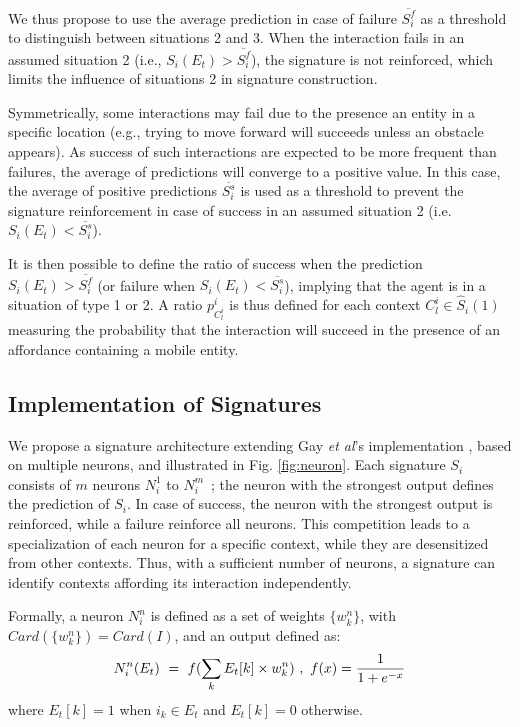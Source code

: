 \documentclass[conference]{IEEEtran}
\makeatletter
\let\cite\relax
\DeclareRobustCommand{\cite}{%
	\let\new@cite@pre\@gobble
	\@ifnextchar[\new@cite{\@citex[]}}
\def\new@cite[#1]{\@ifnextchar[{\new@citea{#1}}{\@citex[#1]}}
\def\new@citea#1{\def\new@cite@pre{#1}\@citex}
\makeatother
\begin{document}
We thus propose to use the average prediction in case of failure $\overline{S_i^f}$ as a threshold to distinguish between situations 2 and 3.
When the interaction fails in an assumed situation 2 (i.e., $S_i(E_t)>\overline{S_i^f}$), the signature is not reinforced, which limits the influence of situations 2 in signature construction. 


Symmetrically, some interactions may fail due to the presence an entity in a specific location (e.g., trying to move forward will succeeds unless an obstacle appears).
As success of such interactions are expected to be more frequent than failures, the average of predictions will converge to a positive value.
In this case, the average of positive predictions $\overline{S_i^s}$ is used as a threshold to prevent the signature reinforcement in case of success in an assumed situation 2 (i.e. $S_i(E_t)<\overline{S_i^s}$).


It is then possible to define the ratio of success when the prediction $S_i(E_t)>\overline{S_i^f}$ (or failure when $S_i(E_t)<\overline{S_i^s}$), implying that the agent is in a situation of type 1 or 2. A ratio $p_{C_l^i}^i$ is thus defined for each context $C_l^i \in \hat{S}_i(1)$ measuring the probability that the interaction will succeed in the presence of an affordance containing a mobile entity.



\subsection{Implementation of Signatures}\label{contexts}


We propose a signature architecture extending Gay \textit{et al}'s implementation \cite{gay:space}, based on multiple neurons, and illustrated in Fig. \ref{fig:neuron}. Each signature $S_i$ consists of $m$ neurons $N_i^1$ to $N_i^m$~; the neuron with the strongest output defines the prediction of $S_i$. In case of success, the neuron with the strongest output is reinforced, while a failure reinforce all neurons. This competition leads to a specialization of each neuron for a specific context, while they are desensitized from other contexts. Thus, with a sufficient number of neurons, a signature can identify contexts affording its interaction independently.

Formally, a neuron $N_i^n$ is defined as a set of weights $\{w_k^n\}$, with $Card(\{w_k^n\})=Card(I)$, and an output defined as:
\begin{equation}
N_i^n(E_t)~=~f(\sum_{k} E_t[k] \times w_k^n)~,~ f(x) = { {1}\over{1+e^{-x} }}
\end{equation}
where $E_t[k]=1$ when $i_k \in E_t$ and $E_t[k]=0$ otherwise.
\end{document}
